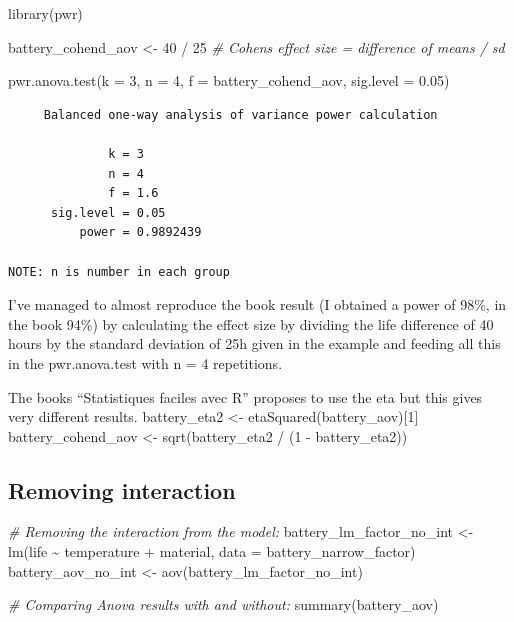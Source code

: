 \documentclass[
]{book}
\newenvironment{Shaded}{\begin{snugshade}}{\end{snugshade}}
\newcommand{\AttributeTok}[1]{\textcolor[rgb]{0.77,0.63,0.00}{#1}}
\newcommand{\CommentTok}[1]{\textcolor[rgb]{0.56,0.35,0.01}{\textit{#1}}}
\newcommand{\DecValTok}[1]{\textcolor[rgb]{0.00,0.00,0.81}{#1}}
\newcommand{\FloatTok}[1]{\textcolor[rgb]{0.00,0.00,0.81}{#1}}
\newcommand{\FunctionTok}[1]{\textcolor[rgb]{0.00,0.00,0.00}{#1}}
\newcommand{\NormalTok}[1]{#1}
\newcommand{\OtherTok}[1]{\textcolor[rgb]{0.56,0.35,0.01}{#1}}
\newcommand{\SpecialCharTok}[1]{\textcolor[rgb]{0.00,0.00,0.00}{#1}}
\begin{document}
\begin{Shaded}
\begin{Highlighting}[]
\FunctionTok{library}\NormalTok{(pwr)}
\end{Highlighting}
\end{Shaded}

\begin{Shaded}
\begin{Highlighting}[]
\NormalTok{battery\_cohend\_aov }\OtherTok{\textless{}{-}} \DecValTok{40} \SpecialCharTok{/} \DecValTok{25} \CommentTok{\# Cohen\textquotesingle{}s effect size = difference of means / sd}

\FunctionTok{pwr.anova.test}\NormalTok{(}\AttributeTok{k =} \DecValTok{3}\NormalTok{,}
               \AttributeTok{n =} \DecValTok{4}\NormalTok{,}
               \AttributeTok{f =}\NormalTok{ battery\_cohend\_aov,}
               \AttributeTok{sig.level =} \FloatTok{0.05}\NormalTok{)}
\end{Highlighting}
\end{Shaded}

\begin{verbatim}
     Balanced one-way analysis of variance power calculation 

              k = 3
              n = 4
              f = 1.6
      sig.level = 0.05
          power = 0.9892439

NOTE: n is number in each group
\end{verbatim}

I've managed to almost reproduce the book result (I obtained a power of 98\%, in the book 94\%) by calculating the effect size by dividing the life difference of 40 hours by the standard deviation of 25h given in the example and feeding all this in the pwr.anova.test with n = 4 repetitions.

The books ``Statistiques faciles avec R'' proposes to use the eta but this gives very different results.
battery\_eta2 \textless- etaSquared(battery\_aov){[}1{]}
battery\_cohend\_aov \textless- sqrt(battery\_eta2 / (1 - battery\_eta2))

\hypertarget{removing-interaction}{%
\subsection{Removing interaction}\label{removing-interaction}}

\begin{Shaded}
\begin{Highlighting}[]
\CommentTok{\# Removing the interaction from the model:}
\NormalTok{battery\_lm\_factor\_no\_int }\OtherTok{\textless{}{-}} \FunctionTok{lm}\NormalTok{(life }\SpecialCharTok{\textasciitilde{}}\NormalTok{ temperature }\SpecialCharTok{+}\NormalTok{ material,}
                        \AttributeTok{data =}\NormalTok{ battery\_narrow\_factor)}
\NormalTok{battery\_aov\_no\_int }\OtherTok{\textless{}{-}} \FunctionTok{aov}\NormalTok{(battery\_lm\_factor\_no\_int)}

\CommentTok{\# Comparing Anova results with and without:}
\FunctionTok{summary}\NormalTok{(battery\_aov)}
\end{Highlighting}
\end{Shaded}
\end{document}
